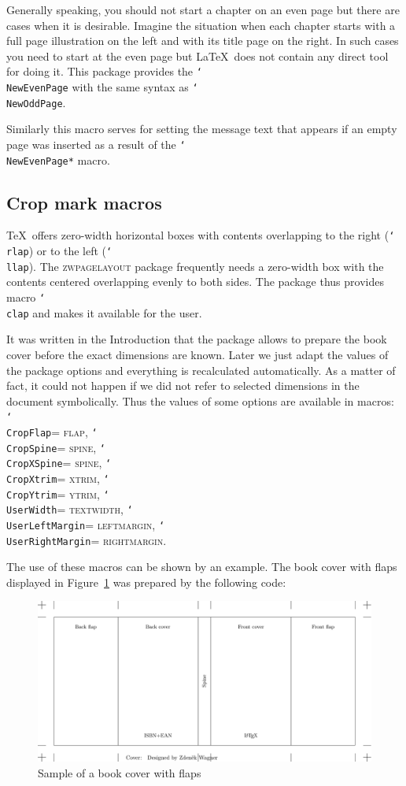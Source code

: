 \documentclass[11pt]{article}
\def\mg#1{\ifvmode\leavevmode\fi\marginpar{\texttt{#1}}\ignorespaces}
\def\cmg#1{\mg{\char`\\#1}}
\def\opt#1{\texorpdfstring{\textmd{\textsc{#1}}}{#1}}
\let\pkg\textsc
\DeclareRobustCommand\cmd[1]{\texttt{\char`\\#1}}
\def\is{\unskip\nobreak\space =\penalty200 \space\ignorespaces}
\begin{document}
\cmg{NewEvenPage}
Generally speaking, you should not start a chapter on an even page but there are cases when it is
desirable. Imagine the situation when each chapter starts with a full page illustration on the left
and with its title page on the right. In such cases you need to start at the even page but \LaTeX\
does not contain any direct tool for doing it. This package provides the \cmd{NewEvenPage} with the
same syntax as \cmd{NewOddPage}.

\cmg{SetEvenPageMessage}
Similarly this macro serves for setting the message text that appears if an empty page was inserted
as a result of the \cmd{NewEvenPage*} macro.

\subsection{Crop mark macros}\label{crop.macros}
\cmg{clap}
\TeX\ offers zero-width horizontal boxes with contents overlapping to the right (\cmd{rlap}) or to
the left (\cmd{llap}). The \pkg{zwpagelayout} package frequently needs a zero-width box with the
contents centered overlapping evenly to both sides. The package thus provides macro \cmd{clap} and
makes it available for the user.

\cmg{CropFlap}
\cmg{CropSpine}
\cmg{CropXSpine}
\cmg{CropXtrim}
\cmg{CropYtrim}
\cmg{UserWidth}
\cmg{UserLeftMargin}
\cmg{UserRightMargin}
It was written in the Introduction that the package allows to prepare the book cover before the
exact dimensions are known. Later we just adapt the values of the package options and everything is
recalculated automatically. As a matter of fact, it could not happen if we did not refer to
selected dimensions in the document symbolically. Thus the values of some options are available in
macros: \cmd{CropFlap}\is\opt{flap}, \cmd{CropSpine}\is\opt{spine}, \cmd{CropXSpine}\is\opt{spine},
\cmd{CropXtrim}\is\opt{xtrim}, \cmd{CropYtrim}\is\opt{ytrim},
\cmd{UserWidth}\is\opt{textwidth}, \cmd{UserLeftMargin}\is\opt{leftmargin},
\cmd{UserRightMargin}\is\opt{rightmargin}.

The use of these macros can be shown by an example. The book cover with flaps displayed in
Figure~\ref{cover} was prepared by the following code:

\vb


\begin{figure}
\centerline{\includegraphics{coversample}}

\caption{Sample of a book cover with flaps}\label{cover}
\end{figure}
\end{document}
